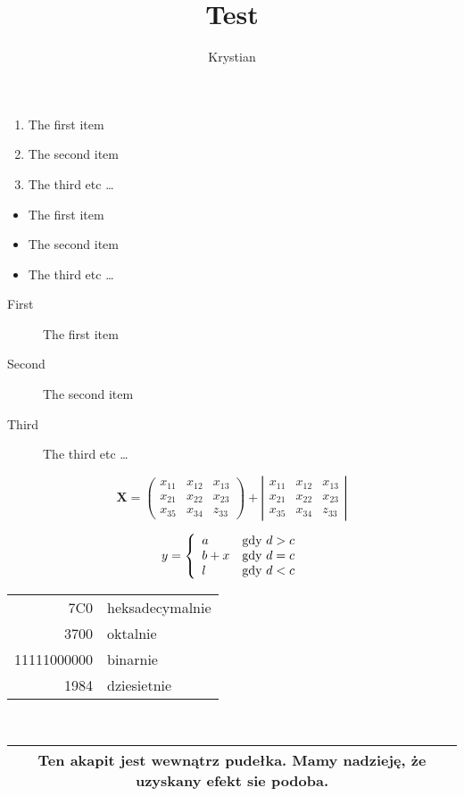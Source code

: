 \documentclass[12pt, a4paper]{article}
\author{Krystian}
\title{Test}
\begin{document}
\maketitle
	
	\begin{enumerate}
		\item The first item
		\item The second item
		\item The third etc \ldots
	\end{enumerate}

\begin{itemize}
	\item The first item
	\item The second item
	\item The third etc \ldots
\end{itemize}

\begin{description}
	\item[First] The first item
	\item[Second] The second item
	\item[Third] The third etc \ldots
\end{description}


	$$
	\mathbf{X} =
	\left( \begin{array}{ccc}
	x_{11} & x_{12} & x_{13} \\
	x_{21} & x_{22} & x_{23} \\
	x_{35} & x_{34} & z_{33}
	\end{array} \right)
	+
	\left| \begin{array}{ccc}
	x_{11} & x_{12} & x_{13} \\
	x_{21} & x_{22} & x_{23} \\
	x_{35} & x_{34} & z_{33}
	\end{array} \right|
	$$ 
	
	$$
	y = \left\{ \begin{array}{ll}
	a & \textrm{gdy $d>c$}\\
	b+x & \textrm{gdy $d=c$}\\
	l & \textrm{gdy $ d < c $}
	\end{array} \right.
	$$
	
	\begin{tabular}{|r|l|} \hline %
		7C0 & heksadecymalnie \\
		3700 & oktalnie \\
		11111000000 & binarnie \\
		\hline \hline
		1984 & dziesietnie \\ \hline
	\end{tabular}
		\\
	
		\begin{tabular}{|c|} \hline
			Ten akapit jest wewnątrz pudełka.
			Mamy nadzieję, że uzyskany
			efekt sie podoba.\\ \hline
		
	\end{tabular}
\end{document}
